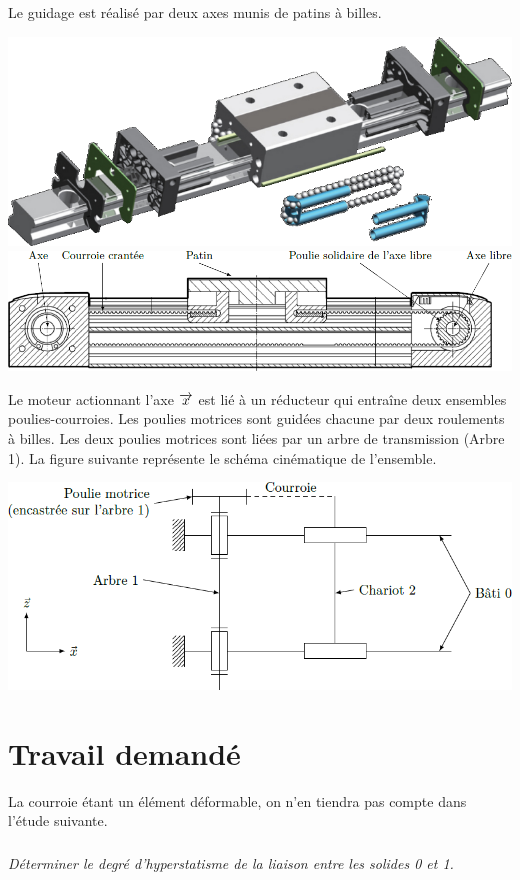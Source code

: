 \documentclass[10pt,fleqn]{article} %
\begin{document}
\begin{multicols}{2}
Le guidage est réalisé par deux axes munis de patins à billes.

\begin{center}
\includegraphics[width=.8\linewidth]{images/fig_03}
\includegraphics[width=\linewidth]{images/fig_04}
\end{center}

Le moteur actionnant l’axe $\overrightarrow{x}$ est lié à un réducteur qui entraîne deux ensembles poulies-courroies. Les poulies motrices sont guidées chacune par deux roulements à billes. Les deux poulies motrices sont liées par un arbre de transmission (Arbre 1). La
figure suivante représente le schéma cinématique de l’ensemble.

\begin{center}
\includegraphics[width=\linewidth]{images/fig_05}
\end{center}
\fi


\section*{Travail demandé}

\ifprof
\else
La courroie étant un élément déformable, on n’en tiendra pas compte dans l’étude suivante.
\fi
\subparagraph{}\textit{Déterminer le degré d’hyperstatisme de la liaison entre les solides 0 et 1.}
\ifprof
\begin{corrige} ~\\


\end{corrige}
\end{multicols}
\end{document}

